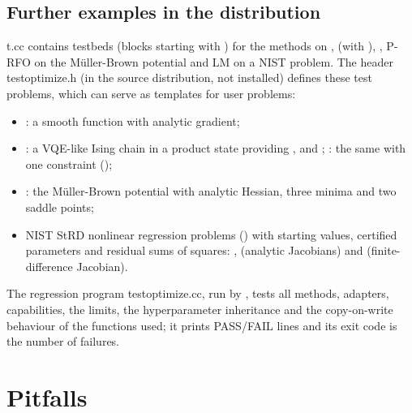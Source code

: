 \subsection{Further examples in the distribution}

t.cc contains testbeds (blocks starting with ) for the methods on ,
 (with ), , P-RFO on the M\"uller-Brown potential
and LM on a NIST problem. The header testoptimize.h (in the source distribution, not installed) defines these test problems, which can serve as
templates for user problems:
\begin{itemize}
\item {}: a smooth function with analytic gradient;
\item {}: a VQE-like Ising chain in a product state providing ,  and
; : the same with one constraint ();
\item {}: the M\"uller-Brown potential \cite{optimize:mueller1979} with analytic Hessian, three
minima and two saddle points;
\item NIST StRD nonlinear regression problems () with starting values, certified parameters and
residual sums of squares: ,  (analytic Jacobians) and
 (finite-difference Jacobian).
\end{itemize} The regression program testoptimize.cc, run by
, tests all methods, adapters, capabilities, the  limits, the hyperparameter inheritance and the
copy-on-write behaviour of the functions used; it prints PASS/FAIL lines and its exit code is the number of failures.

\section{Pitfalls}\label{sec:optimize:pitfalls}


